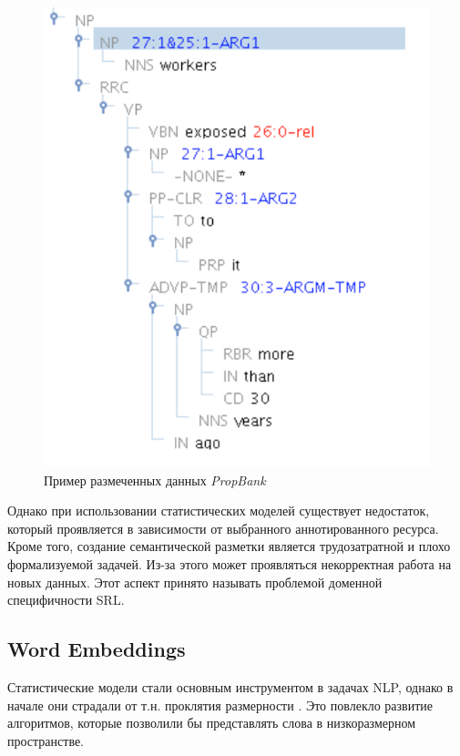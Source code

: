 \begin{figure}[t]
\centering
\includegraphics[scale=0.5]{img/redrelex.png}
\caption{\label{fig:redrelex}Пример размеченных данных \emph{PropBank}}
\end{figure}

Однако при использовании статистических моделей существует недостаток, который проявляется в зависимости от выбранного аннотированного ресурса. Кроме того, создание семантической разметки является трудозатратной и плохо формализуемой задачей. Из-за этого может проявляться некорректная работа на новых данных. Этот аспект принято называть проблемой доменной специфичности SRL.

\subsection{Word Embeddings}

Статистические модели стали основным инструментом в задачах NLP, однако в начале они страдали от т.н. проклятия размерности \autocite{bellman1957dynamic}. Это повлекло развитие алгоритмов, которые позволили бы представлять слова в низкоразмерном пространстве.

